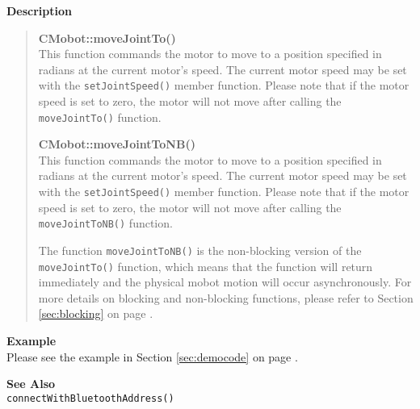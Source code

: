 \noindent
{\bf Description}\\
\vspace{-12pt}
\begin{quote}
{\bf CMobot::moveJointTo()}\\
This function commands the motor to move to a position specified in radians at
the current motor's speed. The current motor speed may be set with the
\texttt{setJointSpeed()} member function. Please note that if the motor speed
is set to zero, the motor will not move after calling the
\texttt{moveJointTo()} function. 

{\bf CMobot::moveJointToNB()}\\
This function commands the motor to move to a position specified in radians at
the current motor's speed. The current motor speed may be set with the
\texttt{setJointSpeed()} member function. Please note that if the motor speed
is set to zero, the motor will not move after calling the
\texttt{moveJointToNB()} function. 

The function \texttt{moveJointToNB()} is the non-blocking version of
the \texttt{moveJointTo()} function, which means that the function will return
immediately and the physical mobot motion will occur asynchronously. For
more details on blocking and non-blocking functions, please refer to 
Section \ref{sec:blocking} on page \pageref{sec:blocking}.\\
\end{quote}

\noindent
{\bf Example}\\
Please see the example in Section \ref{sec:democode} on page \pageref{sec:democode}.\\
\noindent

\noindent
{\bf See Also}\\
\texttt{connectWithBluetoothAddress()}


